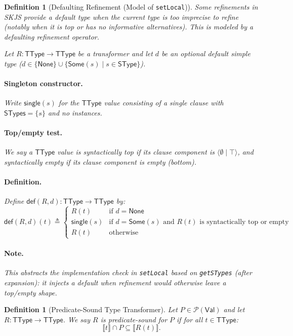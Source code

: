 \documentclass[11pt]{article}
\newtheorem{definition}[theorem]{Definition}
\newcommand{\sem}[1]{\llbracket #1 \rrbracket}
\newcommand{\Pred}{\mathcal{P}(\Val)}
\newcommand{\SType}{\mathsf{SType}}
\newcommand{\TType}{\mathsf{TType}}
\newcommand{\STypes}{\mathsf{STypes}}
\newcommand{\Val}{\mathsf{Val}}
\newcommand{\clause}[2]{\langle #1 \mid #2 \rangle}
\begin{document}
\begin{definition}[Defaulting Refinement (Model of \texttt{setLocal})]
\label{def:defaulting-refinement}
Some refinements in SKJS provide a \emph{default} type when the current type is too imprecise to refine (notably when it is top or has no informative alternatives).
This is modeled by a \emph{defaulting refinement} operator.

Let $R : \TType \to \TType$ be a transformer and let $d$ be an \emph{optional} default simple type ($d \in \{\mathsf{None}\} \cup \{\mathsf{Some}(s)\mid s\in \SType\}$).
\paragraph{Singleton constructor.}
Write $\mathsf{single}(s)$ for the $\TType$ value consisting of a single clause with $\STypes=\{s\}$ and no instances.
\paragraph{Top/empty test.}
We say a $\TType$ value is \emph{syntactically top} if its clause component is $\clause{\emptyset}{\top}$,
and \emph{syntactically empty} if its clause component is empty (bottom).
\paragraph{Definition.}
Define $\mathsf{def}(R,d) : \TType \to \TType$ by:
\[
\mathsf{def}(R,d)(t) \triangleq
\begin{cases}
R(t) & \text{if } d=\mathsf{None} \\
\mathsf{single}(s) & \text{if } d=\mathsf{Some}(s) \text{ and } R(t) \text{ is syntactically top or empty} \\
R(t) & \text{otherwise}
\end{cases}
\]
\paragraph{Note.}
This abstracts the implementation check in \texttt{setLocal} based on \texttt{getSTypes} (after expansion): it injects a default when refinement would otherwise leave a top/empty shape.
\end{definition}

\begin{definition}[Predicate-Sound Type Transformer]
\label{def:predicate-sound-transformer}
Let $P \in \Pred$ and let $R : \TType \to \TType$.
We say $R$ is \emph{predicate-sound for $P$} if for all $t \in \TType$:
\[
\sem{t} \cap P \subseteq \sem{R(t)}.
\]
\end{definition}
\end{document}
